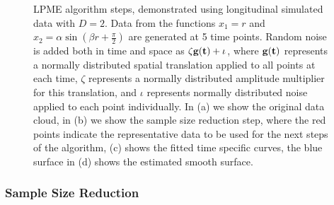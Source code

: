 \documentclass[11pt,reqno]{article}
\theoremstyle{definition}
\begin{document}
\begin{figure}[ht]
  \hfill
  \caption{LPME algorithm steps, demonstrated using longitudinal simulated data with $D=2$. Data from the functions $x_1 = r$ and $x_2 = \alpha \sin \left(\beta r + \frac{\pi}{2}\right)$ are generated at 5 time points. Random noise is added both in time and space as $\zeta \bf{g}(t) + \iota$, where $\bf{g}(t)$ represents a normally distributed spatial translation applied to all points at each time, $\zeta$ represents a normally distributed amplitude multiplier for this translation, and $\iota$ represents normally distributed noise applied to each point individually. In (a) we show the original data cloud, in (b) we show the sample size reduction step, where the red points indicate the representative data to be used for the next steps of the algorithm, (c) shows the fitted time specific curves, the blue surface in (d) shows the estimated smooth surface. }
  \label{fig:lpme_steps}
\end{figure}


\subsubsection{Sample Size Reduction}
\end{document}
